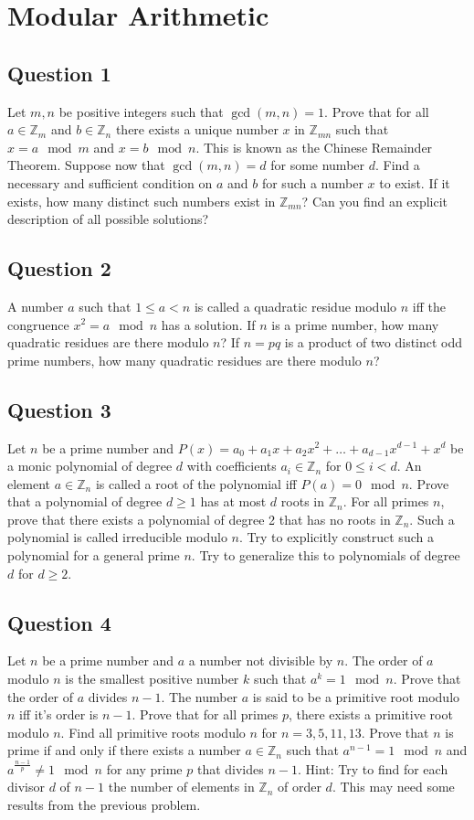 \documentclass[12pt]{report}
\begin{document}
\chapter{Modular Arithmetic}
\section*{Question 1}
Let $m, n$ be positive integers such that $\gcd(m, n) = 1$. Prove that for all $a \in \mathbb{Z}_{m}$ and $b \in \mathbb{Z}_{n}$ there exists a unique number $x$ in $\mathbb{Z}_{mn}$ such that $x = a \mod m$ and $x = b \mod n$. This is known as the Chinese Remainder Theorem. Suppose now that $\gcd(m, n) = d$ for some number $d$. Find a necessary and sufficient condition on $a$ and $b$ for such a number $x$ to exist. If it exists, how many distinct such numbers exist in $\mathbb{Z}_{mn}$? Can you find an explicit description of all possible solutions? 
\section*{Question 2}
A number $a$ such that $1 \leq a < n$ is called a quadratic residue modulo $n$ iff the congruence $x^2 = a \mod n$ has a solution. If $n$ is a prime number, how many quadratic residues are there modulo $n$? If $n = pq$ is a product of two distinct odd prime numbers, how many quadratic residues are there modulo $n$?
\section*{Question 3}
Let $n$ be a prime number and $P(x) = a_{0} + a_{1}x + a_{2}x^2 + \dots + a_{d - 1}x^{d - 1} + x^{d}$ be a monic polynomial of degree $d$ with coefficients $a_{i} \in \mathbb{Z}_{n}$ for $0 \leq i < d$. An element $a \in \mathbb{Z}_{n}$ is called a root of the polynomial iff $P(a) = 0 \mod n$. Prove that a polynomial of degree $d \geq 1$ has at most $d$ roots in $\mathbb{Z}_{n}$. For all primes $n$, prove that there exists a polynomial of degree 2 that has no roots in $\mathbb{Z}_{n}$. Such a polynomial is called irreducible modulo $n$. Try to explicitly construct such a polynomial for a general prime $n$. Try to generalize this to polynomials of degree $d$ for $d \geq 2$.
\section*{Question 4}
Let $n$ be a prime number and $a$ a number not divisible by $n$. The order of $a$ modulo $n$ is the smallest positive number $k$ such that $a^{k} = 1 \mod n$. Prove that the order of $a$ divides $n - 1$. The number $a$ is said to be a primitive root modulo $n$ iff it's order is $n - 1$. Prove that for all primes $p$, there exists a primitive root modulo $n$. Find all primitive roots modulo $n$ for $n = 3, 5, 11, 13$. Prove that $n$ is prime if and only if there exists a number $a \in \mathbb{Z}_{n}$ such that $a^{n - 1} = 1 \mod n$ and $a^{\frac{n - 1}{p}} \neq 1 \mod n$ for any prime $p$ that divides $n - 1$. Hint: Try to find for each divisor $d$ of $n - 1$ the number of elements in $\mathbb{Z}_{n}$ of order $d$. This may need some results from the previous problem.
\end{document}
